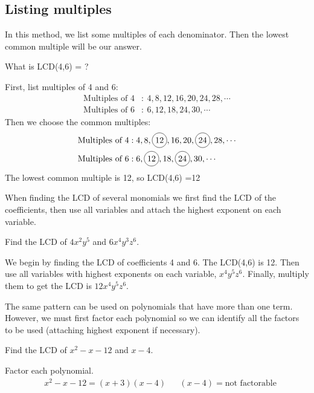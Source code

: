 \subsection{Listing multiples}
In this method, we list some multiples of each denominator. Then the lowest
common multiple will be our answer.
\begin{exa}
	What is LCD(4,6) = ?\\  
\end{exa}
  First, list multiples of 4 and 6:
  \begin{align*}
 	 \text{Multiples of 4}&: \ 4, 8, 12, 16, 20, 24, 28, \cdots\\
  	\text{Multiples of 6}&:\ 6, 12, 18, 24, 30, \cdots
  \end{align*}
Then we choose the common multiples:
\begin{align*}
  \text{Multiples of 4}&: 4, 8, \circled{12}, 16, 20, \circled{24}, 28, \cdots\\
  \text{Multiples of 6}&: 6, \circled{12}, 18,\circled{24}, 30, \cdots
 \end{align*}
  The lowest common multiple is 12, so LCD(4,6) =12
\vspace{0.4cm}
\begin{nt}When finding the LCD of several monomials we first find the LCD of the coefficients, then use all variables and attach the highest exponent on each variable.\\
\end{nt}
\begin{exa}
	Find the LCD of $4x^2y^5$ and $6x^4y^3z^6$.
\end{exa}
We begin by finding the LCD of coefficients 4 and 6. The LCD(4,6) is 12. Then
use all variables with highest exponents on each variable, $x^4y^5z^6$. Finally,
multiply them to get the LCD is $12x^4y^5z^6$.\\
\begin{nt}
The same pattern can be used on polynomials that have more than one term.
However, we must first factor each polynomial so we can identify all the factors to be used (attaching highest exponent if necessary).\\
\end{nt}
\begin{exa}
	Find the LCD of $x^2-x-12$ and $x-4$.
\end{exa}
Factor each polynomial.
\begin{align*}
		&x^2-x-12=(x+3)(x-4) &  	&(x-4) =\text{not factorable}
\end{align*}
